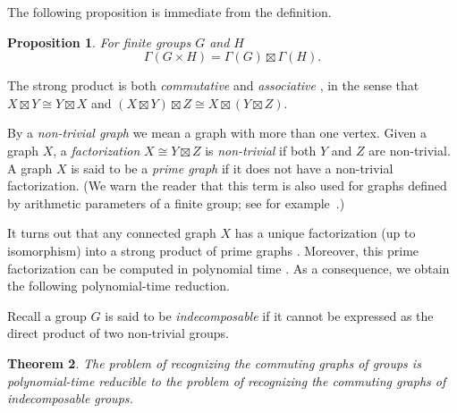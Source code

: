 \documentclass{elsarticle}
\newtheorem{theorem}{Theorem}[section]
\newtheorem{prop}[theorem]{Proposition}
\begin{document}
The following proposition is immediate from the definition.

\begin{prop}\label{cgraph-strong}
  For finite groups $G$ and $H$
  \[
  \Gamma(G\times H) = \Gamma(G)\boxtimes \Gamma(H).
  \]
\end{prop}

The strong product is both \emph{commutative} and \emph{associative}
\cite[Chapter 4]{IK08book}, in the sense that $X\boxtimes Y\cong
Y\boxtimes X$ and $(X\boxtimes Y)\boxtimes Z\cong X\boxtimes
(Y\boxtimes Z)$.

By a \emph{non-trivial graph} we mean a graph with more than one
vertex. Given a graph $X$, a \emph{factorization} $X\cong Y\boxtimes
Z$ is \emph{non-trivial} if both $Y$ and $Z$ are non-trivial. A graph
$X$ is said to be a \emph{prime graph} if it does not have a
non-trivial factorization. (We warn the reader that this term is also used
for graphs defined by arithmetic parameters of a finite group; see for
example~\cite{Mas_pg}.)

It turns out that any connected graph $X$ has a unique factorization
(up to isomorphism) into a strong product of prime graphs \cite[Theorem
  7.14]{IK08book}. Moreover, this prime factorization can be
computed in polynomial time \cite{FeSch92}. As a consequence, we
obtain the following polynomial-time reduction.

Recall a group $G$ is said to be \emph{indecomposable} if it
cannot be expressed as the direct product of two non-trivial groups.

\begin{theorem}\label{product-thm}
  The problem of recognizing the commuting graphs of groups is
  polynomial-time reducible to the problem of recognizing the
  commuting graphs of indecomposable groups.
\end{theorem}
\end{document}
